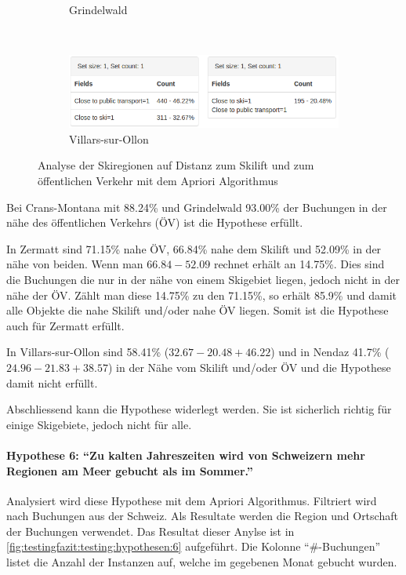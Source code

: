 \begin{figure}[H]
\begin{subfigure}[t]{0.8\textwidth}
		\caption{Grindelwald}
		\label{sec:testingfazit:testing:hypothesen:5:4}
	\end{subfigure} \\
	\begin{subfigure}[t]{0.8\textwidth}
		\centering
		\includegraphics[width=1\textwidth]{images/hypothese5-villars}
		\caption{Villars-sur-Ollon}
		\label{sec:testingfazit:testing:hypothesen:5:5}
	\end{subfigure}
	\caption{Analyse der Skiregionen auf Distanz zum Skilift und zum öffentlichen Verkehr mit dem Apriori Algorithmus}
	\label{sec:testingfazit:testing:hypothesen:5}
\end{figure}

Bei Crans-Montana mit 88.24\% und Grindelwald 93.00\% der Buchungen in der nähe des öffentlichen Verkehrs (ÖV) ist die Hypothese erfüllt. 

In Zermatt sind 71.15\% nahe ÖV, 66.84\% nahe dem Skilift und 52.09\% in der nähe von beiden. Wenn man $66.84 - 52.09$ rechnet erhält an 14.75\%. Dies sind die Buchungen die nur in der nähe von einem Skigebiet liegen, jedoch nicht in der nähe der ÖV. Zählt man diese 14.75\% zu den 71.15\%, so erhält 85.9\% und damit alle Objekte die nahe Skilift und/oder nahe ÖV liegen. Somit ist die Hypothese auch für Zermatt erfüllt.

In Villars-sur-Ollon sind 58.41\% ($32.67-20.48+46.22$)  und in Nendaz 41.7\% ($24.96-21.83+38.57$) in der Nähe vom Skilift und/oder ÖV und die Hypothese damit nicht erfüllt.

Abschliessend kann die Hypothese widerlegt werden. Sie ist sicherlich richtig für einige Skigebiete, jedoch nicht für alle.

\paragraph{Hypothese 6: "`Zu kalten Jahreszeiten wird von Schweizern mehr Regionen am Meer gebucht als im Sommer."'} Analysiert wird diese Hypothese mit dem Apriori Algorithmus. Filtriert wird nach Buchungen aus der Schweiz. Als Resultate werden die Region und Ortschaft der Buchungen verwendet. Das Resultat dieser Anylse ist in \cref{fig:testingfazit:testing:hypothesen:6} aufgeführt. Die Kolonne "`\#-Buchungen"' listet die Anzahl der Instanzen auf, welche im gegebenen Monat gebucht wurden.


